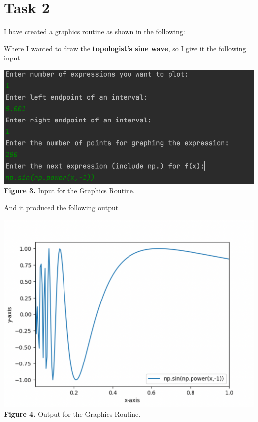 \documentclass{article}
\begin{document}
\section*{Task 2}
I have created a graphics routine as shown in the following:

Where I wanted to draw the {\bf topologist's sine wave}, so I give it the following input
\begin{center}
\includegraphics[scale = 0.8]{Screenshots/input.png}\\
{\bf Figure 3.} Input for the Graphics Routine.
\end{center}
And it produced the following output
\begin{center}
\includegraphics[scale = 0.52]{Screenshots/output.png}\\
{\bf Figure 4.} Output for the Graphics Routine.
\end{center}

\vspace{5pt}
\end{document}

